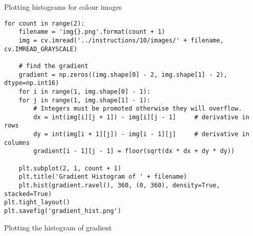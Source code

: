 \documentclass{ee208report}
\begin{document}
\begin{listing}[t]
    \inputminted[linenos, frame=lines]{python}{../opencv/ex10-1.py}
    \caption{Plotting histograms for colour images}
    \label{lst:colour-histogram}
\end{listing}

\begin{listing}[t]
    \begin{verbatim}
for count in range(2):
    filename = 'img{}.png'.format(count + 1)
    img = cv.imread('../instructions/10/images/' + filename, cv.IMREAD_GRAYSCALE)

    # find the gradient
    gradient = np.zeros((img.shape[0] - 2, img.shape[1] - 2), dtype=np.int16)
    for i in range(1, img.shape[0] - 1):
    for j in range(1, img.shape[1] - 1):
        # Integers must be promoted otherwise they will overflow.
        dx = int(img[i][j + 1]) - img[i][j - 1]     # derivative in rows
        dy = int(img[i + 1][j]) - img[i - 1][j]     # derivative in columns
        gradient[i - 1][j - 1] = floor(sqrt(dx * dx + dy * dy))

    plt.subplot(2, 1, count + 1)
    plt.title('Gradient Histogram of ' + filename)
    plt.hist(gradient.ravel(), 360, (0, 360), density=True, stacked=True)
plt.tight_layout()
plt.savefig('gradient_hist.png')
    \end{verbatim}
    \caption{Plotting the histogram of gradient}
    \label{lst:hog}
\end{listing}
\end{document}
